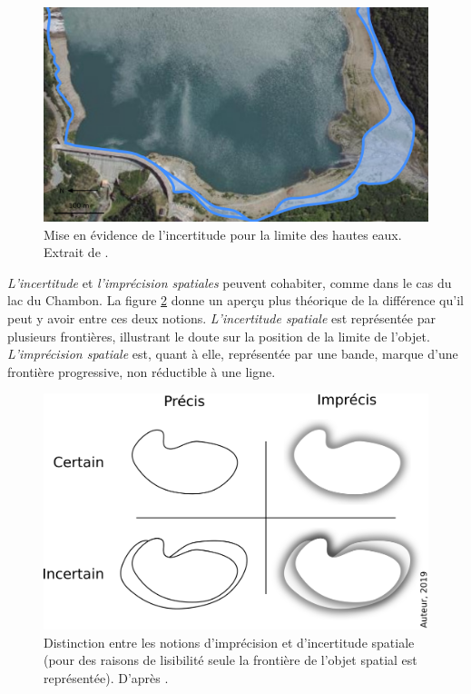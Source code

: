 \begin{figure}
  \centering
  \includegraphics{../figures/fig4.png}
  \caption{Mise en évidence de l'incertitude pour la limite des hautes
    eaux. Extrait de \textcite{Bunel2020}.}
  \label{fig:lim_champ_inc}
\end{figure}

\emph{L’incertitude} et \emph{l’imprécision spatiales} peuvent
cohabiter, comme dans le cas du lac du Chambon. La figure
\ref{fig:inc_vs_imp} donne un aperçu plus théorique de la différence
qu’il peut y avoir entre ces deux notions. \emph{L’incertitude
  spatiale} est représentée par plusieurs frontières, illustrant le
doute sur la position de la limite de l’objet. \emph{L’imprécision
  spatiale} est, quant à elle, représentée par une bande, marque d’une
frontière progressive, non réductible à une ligne.

\begin{figure}
  \centering
  \includegraphics{../figures/fig5.png}
  \caption{Distinction entre les notions d’imprécision et
    d'incertitude spatiale (pour des raisons de lisibilité seule la
    frontière de l’objet spatial est représentée). D'après
    \textcite{Bunel2020}.}
  \label{fig:inc_vs_imp}
\end{figure}

